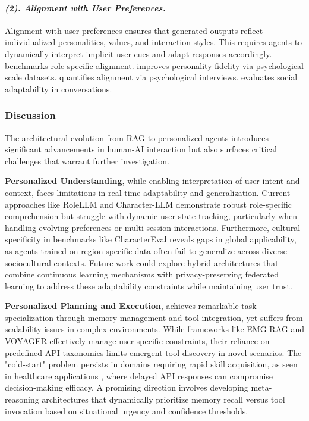 \paragraph{\textbf{\textit{{(2). Alignment with User Preferences.}}}}
Alignment with user preferences ensures that generated outputs reflect individualized personalities, values, and interaction styles. This requires agents to dynamically interpret implicit user cues and adapt responses accordingly.
\citet{wang2023rolellm} benchmarks role-specific alignment. \citet{ran2024capturing} improves personality fidelity via psychological scale datasets. \citet{wang2023incharacter} quantifies alignment via psychological interviews. \citet{chen2024socialbench} evaluates social adaptability in conversations.

\subsubsection{\textbf{Discussion}}
The architectural evolution from RAG to personalized agents introduces significant advancements in human-AI interaction but also surfaces critical challenges that warrant further investigation.

\textbf{Personalized Understanding}, while enabling interpretation of user intent and context, faces limitations in real-time adaptability and generalization. Current approaches like RoleLLM \cite{wang2023rolellm} and Character-LLM \cite{shao2023character} demonstrate robust role-specific comprehension but struggle with dynamic user state tracking, particularly when handling evolving preferences or multi-session interactions. Furthermore, cultural specificity in benchmarks like CharacterEval \cite{tu2024charactereval} reveals gaps in global applicability, as agents trained on region-specific data often fail to generalize across diverse sociocultural contexts. Future work could explore hybrid architectures that combine continuous learning mechanisms with privacy-preserving federated learning to address these adaptability constraints while maintaining user trust.

\textbf{Personalized Planning and Execution}, achieves remarkable task specialization through memory management and tool integration, yet suffers from scalability issues in complex environments. While frameworks like EMG-RAG \cite{wang2024crafting} and VOYAGER \cite{wangvoyager} effectively manage user-specific constraints, their reliance on predefined API taxonomies limits emergent tool discovery in novel scenarios. The "cold-start" problem persists in domains requiring rapid skill acquisition, as seen in healthcare applications \cite{abbasian2023conversational}, where delayed API responses can compromise decision-making efficacy. A promising direction involves developing meta-reasoning architectures that dynamically prioritize memory recall versus tool invocation based on situational urgency and confidence thresholds.


